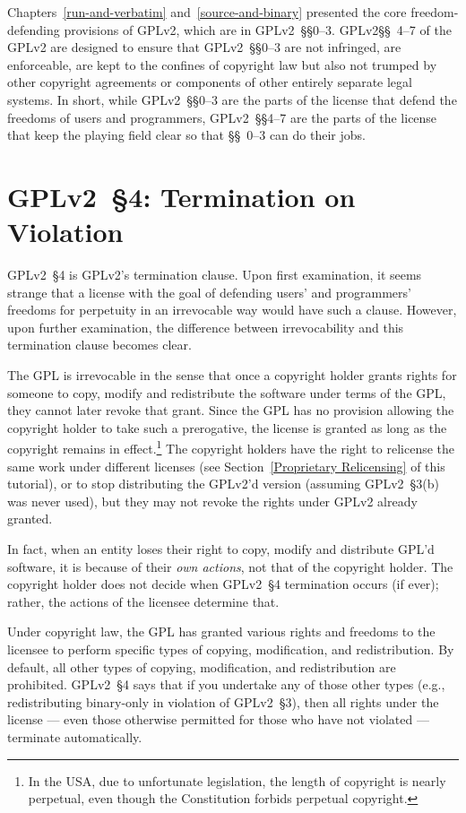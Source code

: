 Chapters~\ref{run-and-verbatim} and~\ref{source-and-binary} presented the
core freedom-defending provisions of GPLv2\@, which are in GPLv2~\S\S0--3.
GPLv2\S\S~4--7 of the GPLv2 are designed to ensure that GPLv2~\S\S0--3 are
not infringed, are enforceable, are kept to the confines of copyright law but
also  not trumped by other copyright agreements or components of other
entirely separate legal systems.  In short, while GPLv2~\S\S0--3 are the parts
of the license that defend the freedoms of users and programmers,
GPLv2~\S\S4--7 are the parts of the license that keep the playing field clear
so that \S\S~0--3 can do their jobs.

\section{GPLv2~\S4: Termination on Violation}
\label{GPLv2s4}

GPLv2~\S4 is GPLv2's termination clause.  Upon first examination, it seems
strange that a license with the goal of defending users' and programmers'
freedoms for perpetuity in an irrevocable way would have such a clause.
However, upon further examination, the difference between irrevocability
and this termination clause becomes clear.

The GPL is irrevocable in the sense that once a copyright holder grants
rights for someone to copy, modify and redistribute the software under terms
of the GPL, they cannot later revoke that grant.  Since the GPL has no
provision allowing the copyright holder to take such a prerogative, the
license is granted as long as the copyright remains in effect.\footnote{In
  the USA, due to unfortunate legislation, the length of copyright is nearly
  perpetual, even though the Constitution forbids perpetual copyright.} The
copyright holders have the right to relicense the same work under different
licenses (see Section~\ref{Proprietary Relicensing} of this tutorial), or to
stop distributing the GPLv2'd version (assuming GPLv2~\S3(b) was never used),
but they may not revoke the rights under GPLv2 already granted.

In fact, when an entity loses their right to copy, modify and distribute
GPL'd software, it is because of their \emph{own actions}, not that of the
copyright holder.  The copyright holder does not decide when GPLv2~\S4
termination occurs (if ever); rather, the actions of the licensee determine
that.

Under copyright law, the GPL has granted various rights and freedoms to
the licensee to perform specific types of copying, modification, and
redistribution.  By default, all other types of copying, modification, and
redistribution are prohibited.  GPLv2~\S4 says that if you undertake any of
those other types (e.g., redistributing binary-only in violation of GPLv2~\S3),
then all rights under the license --- even those otherwise permitted for
those who have not violated --- terminate automatically.

